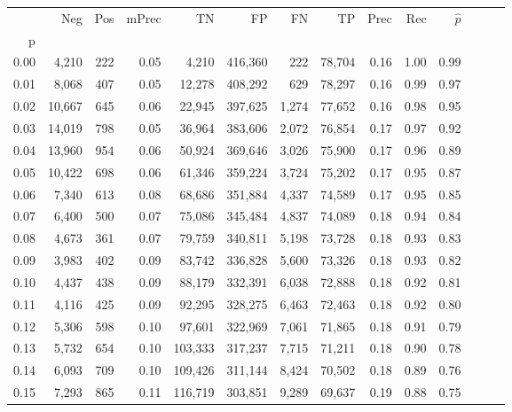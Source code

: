 \begin{tabular}{rrrrrrrrrrrrrr}
\toprule
{} &     Neg &    Pos & mPrec &       TN &       FP &      FN &      TP &  Prec &   Rec & $\hat{p}$ \\
p    &         &        &       &          &          &         &         &       &       &           \\
\midrule
0.00 &   4,210 &    222 &  0.05 &    4,210 &  416,360 &     222 &  78,704 &  0.16 &  1.00 &      0.99 \\
0.01 &   8,068 &    407 &  0.05 &   12,278 &  408,292 &     629 &  78,297 &  0.16 &  0.99 &      0.97 \\
0.02 &  10,667 &    645 &  0.06 &   22,945 &  397,625 &   1,274 &  77,652 &  0.16 &  0.98 &      0.95 \\
0.03 &  14,019 &    798 &  0.05 &   36,964 &  383,606 &   2,072 &  76,854 &  0.17 &  0.97 &      0.92 \\
0.04 &  13,960 &    954 &  0.06 &   50,924 &  369,646 &   3,026 &  75,900 &  0.17 &  0.96 &      0.89 \\
0.05 &  10,422 &    698 &  0.06 &   61,346 &  359,224 &   3,724 &  75,202 &  0.17 &  0.95 &      0.87 \\
0.06 &   7,340 &    613 &  0.08 &   68,686 &  351,884 &   4,337 &  74,589 &  0.17 &  0.95 &      0.85 \\
0.07 &   6,400 &    500 &  0.07 &   75,086 &  345,484 &   4,837 &  74,089 &  0.18 &  0.94 &      0.84 \\
0.08 &   4,673 &    361 &  0.07 &   79,759 &  340,811 &   5,198 &  73,728 &  0.18 &  0.93 &      0.83 \\
0.09 &   3,983 &    402 &  0.09 &   83,742 &  336,828 &   5,600 &  73,326 &  0.18 &  0.93 &      0.82 \\
0.10 &   4,437 &    438 &  0.09 &   88,179 &  332,391 &   6,038 &  72,888 &  0.18 &  0.92 &      0.81 \\
0.11 &   4,116 &    425 &  0.09 &   92,295 &  328,275 &   6,463 &  72,463 &  0.18 &  0.92 &      0.80 \\
0.12 &   5,306 &    598 &  0.10 &   97,601 &  322,969 &   7,061 &  71,865 &  0.18 &  0.91 &      0.79 \\
0.13 &   5,732 &    654 &  0.10 &  103,333 &  317,237 &   7,715 &  71,211 &  0.18 &  0.90 &      0.78 \\
0.14 &   6,093 &    709 &  0.10 &  109,426 &  311,144 &   8,424 &  70,502 &  0.18 &  0.89 &      0.76 \\
0.15 &   7,293 &    865 &  0.11 &  116,719 &  303,851 &   9,289 &  69,637 &  0.19 &  0.88 &      0.75 \\

\end{tabular}

